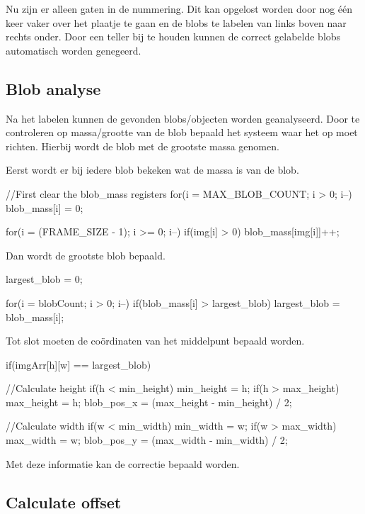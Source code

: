Nu zijn er alleen gaten in de nummering. Dit kan opgelost worden door nog
één keer vaker over het plaatje te gaan en de blobs te labelen van links
boven naar rechts onder. Door een teller bij te houden kunnen de correct
gelabelde blobs automatisch worden genegeerd.

\subsection{Blob analyse}
\label{sub:blobanalyse}
Na het labelen kunnen de gevonden blobs/objecten worden geanalyseerd. Door
te controleren op massa/grootte van de blob bepaald het systeem waar het op
moet richten. Hierbij wordt de blob met de grootste massa genomen.

Eerst wordt er bij iedere blob bekeken wat de massa is van de blob.

\begin{cppcode}
//First clear the blob_mass registers
for(i = MAX_BLOB_COUNT; i > 0; i--){
    blob_mass[i] = 0;
}

for(i = (FRAME_SIZE - 1); i >= 0; i--){
    if(img[i] > 0){
        blob_mass[img[i]]++;
    }
}
\end{cppcode}

Dan wordt de grootste blob bepaald.

\begin{cppcode}
largest_blob = 0;

for(i = blobCount; i > 0; i--){
    if(blob_mass[i] > largest_blob){
        largest_blob = blob_mass[i];
    }
}
\end{cppcode}

Tot slot moeten de coördinaten van het middelpunt bepaald worden.

\begin{cppcode}
if(imgArr[h][w] == largest_blob){
    //Calculate height
    if(h < min_height){
        min_height = h;
    }
    if(h > max_height){
        max_height = h;
    }
    blob_pos_x = (max_height - min_height) / 2;

    //Calculate width
    if(w < min_width){
        min_width = w;
    }
    if(w > max_width){
        max_width = w;
    }
    blob_pos_y = (max_width - min_width) / 2;
}
\end{cppcode}

Met deze informatie kan de correctie bepaald worden.

\subsection{Calculate offset}
\label{sub:calcoffset}


